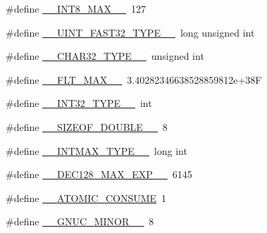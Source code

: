 \begin{DoxyCompactItemize}
\item 
\#define \hyperlink{build-analizer__host-_desktop___qt__5__9__0___g_c_c__64bit-_release_2moc__predefs_8h_a326c37ba86474b37dd0ae9100e005fac}{\+\_\+\+\_\+\+I\+N\+T8\+\_\+\+M\+A\+X\+\_\+\+\_\+}~127
\item 
\#define \hyperlink{build-analizer__host-_desktop___qt__5__9__0___g_c_c__64bit-_release_2moc__predefs_8h_a0746bdc61f4500f26c2b7408814ebfcf}{\+\_\+\+\_\+\+U\+I\+N\+T\+\_\+\+F\+A\+S\+T32\+\_\+\+T\+Y\+P\+E\+\_\+\+\_\+}~long unsigned int
\item 
\#define \hyperlink{build-analizer__host-_desktop___qt__5__9__0___g_c_c__64bit-_release_2moc__predefs_8h_acd1e46c682808f15749b16266ade0c27}{\+\_\+\+\_\+\+C\+H\+A\+R32\+\_\+\+T\+Y\+P\+E\+\_\+\+\_\+}~unsigned int
\item 
\#define \hyperlink{build-analizer__host-_desktop___qt__5__9__0___g_c_c__64bit-_release_2moc__predefs_8h_aa26975016847959a13829cb568b126b3}{\+\_\+\+\_\+\+F\+L\+T\+\_\+\+M\+A\+X\+\_\+\+\_\+}~3.\+40282346638528859812e+38\+F
\item 
\#define \hyperlink{build-analizer__host-_desktop___qt__5__9__0___g_c_c__64bit-_release_2moc__predefs_8h_a72f76585ea7d1131d4e9be0110fb0ec3}{\+\_\+\+\_\+\+I\+N\+T32\+\_\+\+T\+Y\+P\+E\+\_\+\+\_\+}~int
\item 
\#define \hyperlink{build-analizer__host-_desktop___qt__5__9__0___g_c_c__64bit-_release_2moc__predefs_8h_a6a0b73b50b59fa18dbcea5b6dee0899f}{\+\_\+\+\_\+\+S\+I\+Z\+E\+O\+F\+\_\+\+D\+O\+U\+B\+L\+E\+\_\+\+\_\+}~8
\item 
\#define \hyperlink{build-analizer__host-_desktop___qt__5__9__0___g_c_c__64bit-_release_2moc__predefs_8h_ad3062ff83239e8dd2b8969a2f368d608}{\+\_\+\+\_\+\+I\+N\+T\+M\+A\+X\+\_\+\+T\+Y\+P\+E\+\_\+\+\_\+}~long int
\item 
\#define \hyperlink{build-analizer__host-_desktop___qt__5__9__0___g_c_c__64bit-_release_2moc__predefs_8h_aab1edcef0b79684e5d2f12a2696e260f}{\+\_\+\+\_\+\+D\+E\+C128\+\_\+\+M\+A\+X\+\_\+\+E\+X\+P\+\_\+\+\_\+}~6145
\item 
\#define \hyperlink{build-analizer__host-_desktop___qt__5__9__0___g_c_c__64bit-_release_2moc__predefs_8h_a762c3361bcfeccc1f2742cc94b1ab65b}{\+\_\+\+\_\+\+A\+T\+O\+M\+I\+C\+\_\+\+C\+O\+N\+S\+U\+M\+E}~1
\item 
\#define \hyperlink{build-analizer__host-_desktop___qt__5__9__0___g_c_c__64bit-_release_2moc__predefs_8h_a0b8ad52bece225cdae9c1b46c91c62a5}{\+\_\+\+\_\+\+G\+N\+U\+C\+\_\+\+M\+I\+N\+O\+R\+\_\+\+\_\+}~8
\item 

\end{DoxyCompactItemize}
